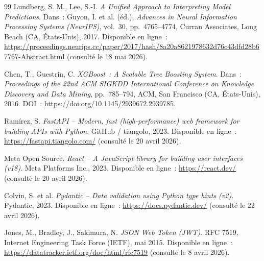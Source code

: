 \begin{thebibliography}{99}
Lundberg, S. M., Lee, S.-I.
\emph{A Unified Approach to Interpreting Model Predictions}.
Dans~: Guyon, I. et al. (éd.), \emph{Advances in Neural Information Processing Systems (NeurIPS)},
vol.~30, pp.~4765--4774, Curran Associates, Long Beach (CA, États-Unis), 2017.
Disponible en ligne~: \url{https://proceedings.neurips.cc/paper/2017/hash/8a20a8621978632d76c43dfd28b67767-Abstract.html}
(consulté le 18 mai 2026).

Chen, T., Guestrin, C.
\emph{XGBoost~: A Scalable Tree Boosting System}.
Dans~: \emph{Proceedings of the 22nd ACM SIGKDD International Conference on Knowledge Discovery and Data Mining},
pp.~785--794, ACM, San Francisco (CA, États-Unis), 2016.
DOI~: \url{https://doi.org/10.1145/2939672.2939785}.


Ramírez, S.
\emph{FastAPI -- Modern, fast (high-performance) web framework for building APIs with Python}.
GitHub / tiangolo, 2023.
Disponible en ligne~: \url{https://fastapi.tiangolo.com/}
(consulté le 20 avril 2026).

Meta Open Source.
\emph{React -- A JavaScript library for building user interfaces (v18)}.
Meta Platforms Inc., 2023.
Disponible en ligne~: \url{https://react.dev/}
(consulté le 20 avril 2026).

Colvin, S. et al.
\emph{Pydantic -- Data validation using Python type hints (v2)}.
Pydantic, 2023.
Disponible en ligne~: \url{https://docs.pydantic.dev/}
(consulté le 22 avril 2026).

Jones, M., Bradley, J., Sakimura, N.
\emph{JSON Web Token (JWT)}.
RFC 7519, Internet Engineering Task Force (IETF), mai 2015.
Disponible en ligne~: \url{https://datatracker.ietf.org/doc/html/rfc7519}
(consulté le 8 avril 2026).

\end{thebibliography}
